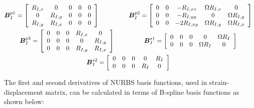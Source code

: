 \documentclass[3p,preprint,12pt]{elsarticle}
\begin{document}
\begin{equation*}
\begin{gathered}
\boldsymbol{B}_{I}^{p1}=\left[\begin{array}{ccccc}
R_{I,x} & 0 & 0 & 0 & 0\\
0 & R_{I,y} & 0 & 0 & 0\\
R_{I,y} & R_{I,x} & 0 & 0 & 0
\end{array}\right]\hspace{1.6cm}
\boldsymbol{B}_{I}^{p2}=\left[\begin{array}{ccccc}
0 & 0 & -R_{I,xx} & \Omega R_{I,x} & 0\\
0 & 0 & -R_{I,yy} & 0 & \Omega R_{I,y}\\
0 & 0 & -2R_{I,xy} & \Omega R_{I,y} & \Omega R_{I,x}
\end{array}\right]
\\
\boldsymbol{B}_{I}^{p3}=\left[\begin{array}{ccccc}
0 & 0 & 0 & R_{I,x} & 0\\
0 & 0 & 0 & 0 & R_{I,y}\\
0 & 0 & 0 & R_{I,y} & R_{I,x}
\end{array}\right]\hspace{1.6cm}
\boldsymbol{B}_{I}^{s1}=\left[\begin{array}{ccccc}
0 & 0 & 0 & 0 & \Omega R_{I}\\
0 & 0 & 0 & \Omega R_{I} & 0
\end{array}\right]
\\
\boldsymbol{B}_{I}^{s2}=\left[\begin{array}{ccccc}
0 & 0 & 0 & 0 & R_{I}\\
0 & 0 & 0 & R_{I} & 0
\end{array}\right]
\end{gathered}
\end{equation*}

The first and second derivatives of NURBS basis functions, used in strain-displacement matrix, can be calculated in terms of B-spline basis functions \cite{hughes2005isogeometric} as shown below:
\end{document}
